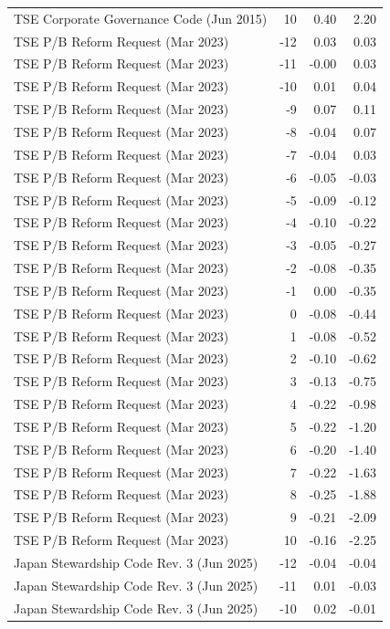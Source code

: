 \begin{table}
\begin{tabular}{lrrr}
TSE Corporate Governance Code (Jun 2015) & 10 & 0.40 & 2.20 \\
TSE P/B Reform Request (Mar 2023) & -12 & 0.03 & 0.03 \\
TSE P/B Reform Request (Mar 2023) & -11 & -0.00 & 0.03 \\
TSE P/B Reform Request (Mar 2023) & -10 & 0.01 & 0.04 \\
TSE P/B Reform Request (Mar 2023) & -9 & 0.07 & 0.11 \\
TSE P/B Reform Request (Mar 2023) & -8 & -0.04 & 0.07 \\
TSE P/B Reform Request (Mar 2023) & -7 & -0.04 & 0.03 \\
TSE P/B Reform Request (Mar 2023) & -6 & -0.05 & -0.03 \\
TSE P/B Reform Request (Mar 2023) & -5 & -0.09 & -0.12 \\
TSE P/B Reform Request (Mar 2023) & -4 & -0.10 & -0.22 \\
TSE P/B Reform Request (Mar 2023) & -3 & -0.05 & -0.27 \\
TSE P/B Reform Request (Mar 2023) & -2 & -0.08 & -0.35 \\
TSE P/B Reform Request (Mar 2023) & -1 & 0.00 & -0.35 \\
TSE P/B Reform Request (Mar 2023) & 0 & -0.08 & -0.44 \\
TSE P/B Reform Request (Mar 2023) & 1 & -0.08 & -0.52 \\
TSE P/B Reform Request (Mar 2023) & 2 & -0.10 & -0.62 \\
TSE P/B Reform Request (Mar 2023) & 3 & -0.13 & -0.75 \\
TSE P/B Reform Request (Mar 2023) & 4 & -0.22 & -0.98 \\
TSE P/B Reform Request (Mar 2023) & 5 & -0.22 & -1.20 \\
TSE P/B Reform Request (Mar 2023) & 6 & -0.20 & -1.40 \\
TSE P/B Reform Request (Mar 2023) & 7 & -0.22 & -1.63 \\
TSE P/B Reform Request (Mar 2023) & 8 & -0.25 & -1.88 \\
TSE P/B Reform Request (Mar 2023) & 9 & -0.21 & -2.09 \\
TSE P/B Reform Request (Mar 2023) & 10 & -0.16 & -2.25 \\
Japan Stewardship Code Rev. 3 (Jun 2025) & -12 & -0.04 & -0.04 \\
Japan Stewardship Code Rev. 3 (Jun 2025) & -11 & 0.01 & -0.03 \\
Japan Stewardship Code Rev. 3 (Jun 2025) & -10 & 0.02 & -0.01 \\

\end{tabular}
\end{table}
